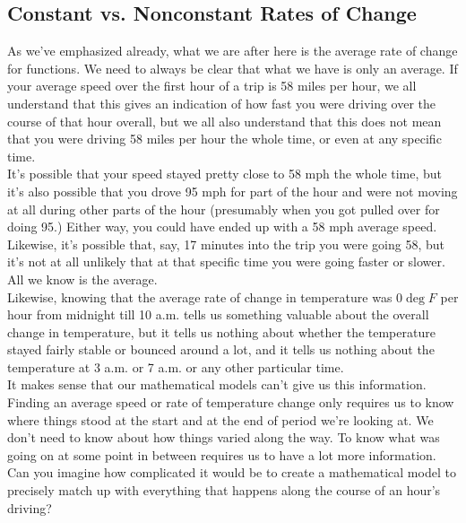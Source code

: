%
%

\subsection{Constant vs. Nonconstant Rates of Change}

As we’ve emphasized already, what we are after here is the average rate of change for functions.  We need to always be clear that what we have is only an average. If your average speed over the first hour of a trip is 58 miles per hour, we all understand that this gives an indication of how fast you were driving over the course of that hour overall, but we all also understand that this does not mean that you were driving 58 miles per hour the whole time, or even at any specific time.\\

It’s possible that your speed stayed pretty close to 58 mph the whole time, but it’s also possible that you drove 95 mph for part of the hour and were not moving at all during other parts of the hour (presumably when you got pulled over for doing 95.) Either way, you could have ended up with a 58 mph average speed. Likewise, it’s possible that, say, 17 minutes into the trip you were going 58, but it’s not at all unlikely that at that specific time you were going faster or slower. All we know is the average.\\

Likewise, knowing that the average rate of change in temperature was $0 \deg F$ per hour from midnight till 10 a.m. tells us something valuable about the overall change in temperature, but it tells us nothing about whether the temperature stayed fairly stable or bounced around a lot, and it tells us nothing about the temperature at 3 a.m. or 7 a.m. or any other particular time.\\

It makes sense that our mathematical models can’t give us this information. Finding an average speed or rate of temperature change only requires us to know where things stood at the start and at the end of period we’re looking at. We don’t need to know about how things varied along the way.  To know what was going on at some point in between requires us to have a lot more information.  Can you imagine how complicated it would be to create a mathematical model to precisely match
up with everything that happens along the course of an hour’s driving?\\

